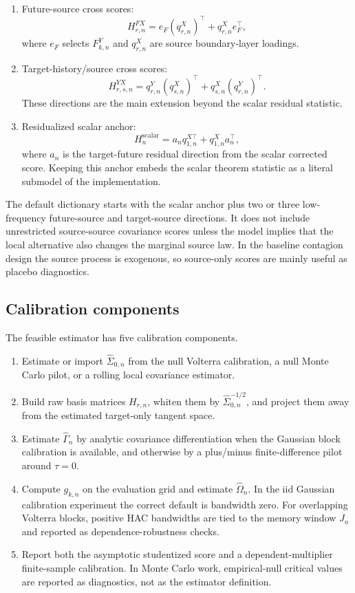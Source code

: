 \documentclass[11pt,a4paper]{amsart}
\theoremstyle{plain}
\theoremstyle{definition}
\theoremstyle{remark}
\begin{document}
\begin{enumerate}[label=(\arabic*)]
\item Future-source cross scores:
\[
        H_{r,n}^{FX}
        =
        e_F (q_{r,n}^{X})^\top
        +
        q_{r,n}^{X} e_F^\top,
\]
where \(e_F\) selects \(F_{k,n}^{Y}\) and \(q_{r,n}^{X}\) are source boundary-layer loadings.
\item Target-history/source cross scores:
\[
        H_{r,s,n}^{YX}
        =
        q_{r,n}^{Y}(q_{s,n}^{X})^\top
        +
        q_{s,n}^{X}(q_{r,n}^{Y})^\top.
\]
These directions are the main extension beyond the scalar residual statistic.
\item Residualized scalar anchor:
\[
        H_{n}^{\mathrm{scalar}}
        =
        a_n q_{1,n}^{X\top}
        +
        q_{1,n}^{X}a_n^\top,
\]
where \(a_n\) is the target-future residual direction from the scalar corrected score.  Keeping
this anchor embeds the scalar theorem statistic as a literal submodel of the implementation.
\end{enumerate}

The default dictionary starts with the scalar anchor plus two or three low-frequency
future-source and target-source directions.  It does not include unrestricted source-source
covariance scores unless the model implies that the local alternative also changes the marginal
source law.  In the baseline contagion design the source process is exogenous, so source-only scores
are mainly useful as placebo diagnostics.

\subsection{Calibration components}

The feasible estimator has five calibration components.
\begin{enumerate}[label=(\roman*)]
\item Estimate or import \(\widehat\Sigma_{0,n}\) from the null Volterra calibration, a null Monte Carlo
pilot, or a rolling local covariance estimator.
\item Build raw basis matrices \(H_{r,n}\), whiten them by \(\widehat\Sigma_{0,n}^{-1/2}\), and project
them away from the estimated target-only tangent space.
\item Estimate \(\widehat\Gamma_n\) by analytic covariance differentiation when the Gaussian block
calibration is available, and otherwise by a plus/minus finite-difference pilot around \(\tau=0\).
\item Compute \(g_{k,n}\) on the evaluation grid and estimate \(\widehat\Omega_n\).  In the iid
Gaussian calibration experiment the correct default is bandwidth zero.  For overlapping Volterra
blocks, positive HAC bandwidths are tied to the memory window \(J_n\) and reported as
dependence-robustness checks.
\item Report both the asymptotic studentized score and a dependent-multiplier finite-sample
calibration.  In Monte Carlo work, empirical-null critical values are reported as diagnostics,
not as the estimator definition.
\end{enumerate}
\end{document}
